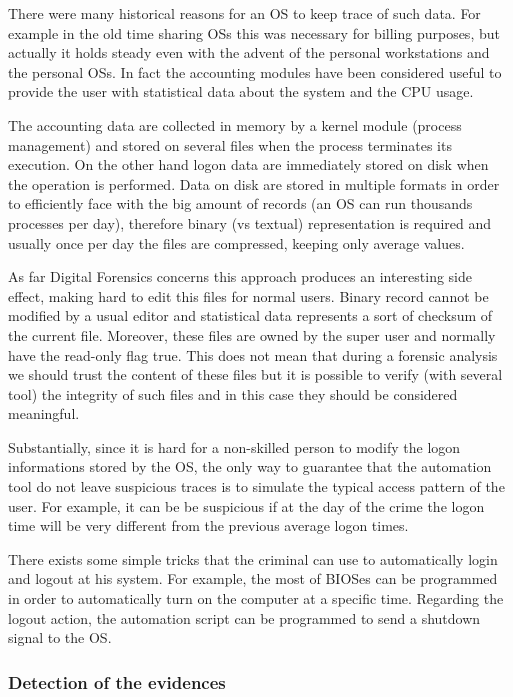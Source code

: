 \documentclass[runningheads,english]{llncs}
\begin{document}
{There were many historical reasons for an OS to keep trace of such data. For
example in the old time sharing OSs this was necessary for billing purposes, but
actually it holds steady even with the advent of the personal workstations and
the personal OSs. In fact the accounting modules have been considered useful to
provide the user with statistical data about the system and the CPU usage. 

The accounting data are collected in memory by a kernel module (process
management) and stored on several files when the process terminates its
execution. On the other hand logon data are immediately stored on disk when the
operation is performed.
Data on disk are stored in multiple formats in order to efficiently face with
the big amount of records (an OS can run thousands processes per day), therefore
binary (vs textual) representation is required and  usually once per day the
files are compressed, keeping only average values.

As far Digital Forensics concerns this  approach produces an interesting side
effect, making hard to edit this files for normal users. Binary record cannot be
modified by a usual editor and statistical data represents a sort of checksum of
the current file. Moreover, these files are owned by the super user and normally
have the read-only flag true. This does not mean that during a forensic analysis
we should trust the content of these files but it is possible to verify (with
several tool) the integrity of such files and in this case they should be
considered meaningful.

Substantially, since it is hard for a non-skilled person to modify the logon informations stored by the OS, the only way to guarantee that the automation tool do not leave suspicious traces is to simulate the typical access pattern of the user. For example, it can be be suspicious if at the day of the crime the logon time will be very different from the previous average logon times. 

There exists some simple tricks that the criminal can use to automatically login and logout at his system. For example, the most of BIOSes can be programmed in order to automatically turn on the computer at a specific time. Regarding the logout action, the automation script can be programmed to send a shutdown signal to the OS. 

\subsubsection{Detection of the evidences}

}
\end{document}
